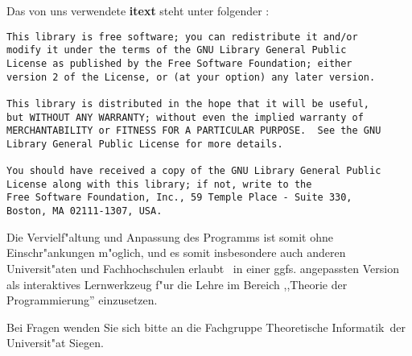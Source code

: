 Das von uns verwendete {\bf itext} steht unter folgender :

\begin{verbatim}
This library is free software; you can redistribute it and/or
modify it under the terms of the GNU Library General Public
License as published by the Free Software Foundation; either
version 2 of the License, or (at your option) any later version.

This library is distributed in the hope that it will be useful,
but WITHOUT ANY WARRANTY; without even the implied warranty of
MERCHANTABILITY or FITNESS FOR A PARTICULAR PURPOSE.  See the GNU
Library General Public License for more details.

You should have received a copy of the GNU Library General Public
License along with this library; if not, write to the
Free Software Foundation, Inc., 59 Temple Place - Suite 330,
Boston, MA 02111-1307, USA.
\end{verbatim}

Die Vervielf"altung und Anpassung des Programms ist somit ohne Einschr"ankungen m"oglich, und es somit insbesondere auch anderen Universit"aten und Fachhochschulen erlaubt \TPML\ in einer ggfs. angepassten
Version als interaktives Lernwerkzeug f"ur die Lehre im Bereich ,,Theorie der Programmierung'' einzusetzen.

Bei Fragen wenden Sie sich bitte an die Fachgruppe \glqq Theoretische Informatik\grqq\ der Universit"at Siegen.



